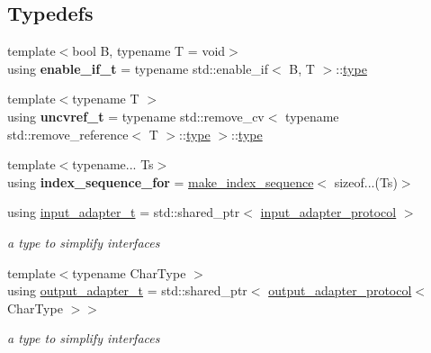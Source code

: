 \subsection*{Typedefs}
\begin{DoxyCompactItemize}
\item 
{\footnotesize template$<$bool B, typename T  = void$>$ }\\using {\bfseries enable\+\_\+if\+\_\+t} = typename std\+::enable\+\_\+if$<$ B, T $>$\+::\hyperlink{classstd_1_1conditional_1_1type}{type}\hypertarget{namespacenlohmann_1_1detail_a02bcbc878bee413f25b985ada771aa9c}{}\label{namespacenlohmann_1_1detail_a02bcbc878bee413f25b985ada771aa9c}

\item 
{\footnotesize template$<$typename T $>$ }\\using {\bfseries uncvref\+\_\+t} = typename std\+::remove\+\_\+cv$<$ typename std\+::remove\+\_\+reference$<$ T $>$\+::\hyperlink{classstd_1_1conditional_1_1type}{type} $>$\+::\hyperlink{classstd_1_1conditional_1_1type}{type}\hypertarget{namespacenlohmann_1_1detail_a53a082eedad9f4729fcd8fed552a21f7}{}\label{namespacenlohmann_1_1detail_a53a082eedad9f4729fcd8fed552a21f7}

\item 
{\footnotesize template$<$typename... Ts$>$ }\\using {\bfseries index\+\_\+sequence\+\_\+for} = \hyperlink{structnlohmann_1_1detail_1_1make__index__sequence}{make\+\_\+index\+\_\+sequence}$<$ sizeof...(Ts)$>$\hypertarget{namespacenlohmann_1_1detail_a24800493c6ec02ce033dcbb47b7fd28e}{}\label{namespacenlohmann_1_1detail_a24800493c6ec02ce033dcbb47b7fd28e}

\item 
using \hyperlink{namespacenlohmann_1_1detail_ae132f8cd5bb24c5e9b40ad0eafedf1c2}{input\+\_\+adapter\+\_\+t} = std\+::shared\+\_\+ptr$<$ \hyperlink{structnlohmann_1_1detail_1_1input__adapter__protocol}{input\+\_\+adapter\+\_\+protocol} $>$\hypertarget{namespacenlohmann_1_1detail_ae132f8cd5bb24c5e9b40ad0eafedf1c2}{}\label{namespacenlohmann_1_1detail_ae132f8cd5bb24c5e9b40ad0eafedf1c2}

\begin{DoxyCompactList}\small\item\em a type to simplify interfaces \end{DoxyCompactList}\item 
{\footnotesize template$<$typename Char\+Type $>$ }\\using \hyperlink{namespacenlohmann_1_1detail_a0fd8edff7729aa2dd92b070964bade2e}{output\+\_\+adapter\+\_\+t} = std\+::shared\+\_\+ptr$<$ \hyperlink{structnlohmann_1_1detail_1_1output__adapter__protocol}{output\+\_\+adapter\+\_\+protocol}$<$ Char\+Type $>$$>$\hypertarget{namespacenlohmann_1_1detail_a0fd8edff7729aa2dd92b070964bade2e}{}\label{namespacenlohmann_1_1detail_a0fd8edff7729aa2dd92b070964bade2e}

\begin{DoxyCompactList}\small\item\em a type to simplify interfaces \end{DoxyCompactList}\end{DoxyCompactItemize}
